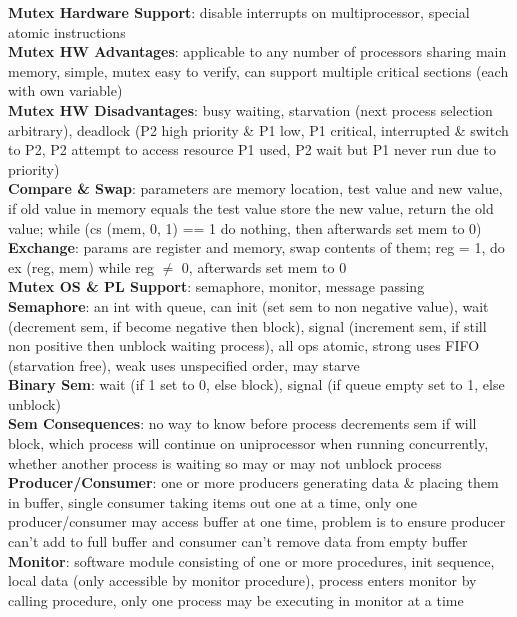 \documentclass[a4paper]{article}
\begin{document}
\begin{multicols}{2}
        \textbf{Mutex Hardware Support}: disable interrupts on multiprocessor, special atomic instructions\\
        \textbf{Mutex HW Advantages}: applicable to any number of processors sharing main memory, simple, mutex easy to verify, can support multiple critical sections (each with own variable)\\
        \textbf{Mutex HW Disadvantages}: busy waiting, starvation (next process selection arbitrary), deadlock (P2 high priority \& P1 low, P1 critical, interrupted \& switch to P2, P2 attempt to access resource P1 used, P2 wait but P1 never run due to priority)\\
        \textbf{Compare \& Swap}: parameters are memory location, test value and new value, if old value in memory equals the test value store the new value, return the old value; while (cs (mem, 0, 1) == 1 do nothing, then afterwards set mem to 0)\\
        \textbf{Exchange}: params are register and memory, swap contents of them; reg = 1, do ex (reg, mem) while reg $\neq$ 0, afterwards set mem to 0\\
        \textbf{Mutex OS \& PL Support}: semaphore, monitor, message passing\\
        \textbf{Semaphore}: an int with queue, can init (set sem to non negative value), wait (decrement sem, if become negative then block), signal (increment sem, if still non positive then unblock waiting process), all ops atomic, strong uses FIFO (starvation free), weak uses unspecified order, may starve\\
        \textbf{Binary Sem}: wait (if 1 set to 0, else block), signal (if queue empty set to 1, else unblock)\\
        \textbf{Sem Consequences}: no way to know before process decrements sem if will block, which process will continue on uniprocessor when running concurrently, whether another process is waiting so may or may not unblock process\\
        \textbf{Producer/Consumer}: one or more producers generating data \& placing them in buffer, single consumer taking items out one at a time, only one producer/consumer may access buffer at one time, problem is to ensure producer can't add to full buffer and consumer can't remove data from empty buffer\\
        \textbf{Monitor}: software module consisting of one or more procedures, init sequence, local data (only accessible by monitor procedure), process enters monitor by calling procedure, only one process may be executing in monitor at a time\\

\end{multicols}
\end{document}
